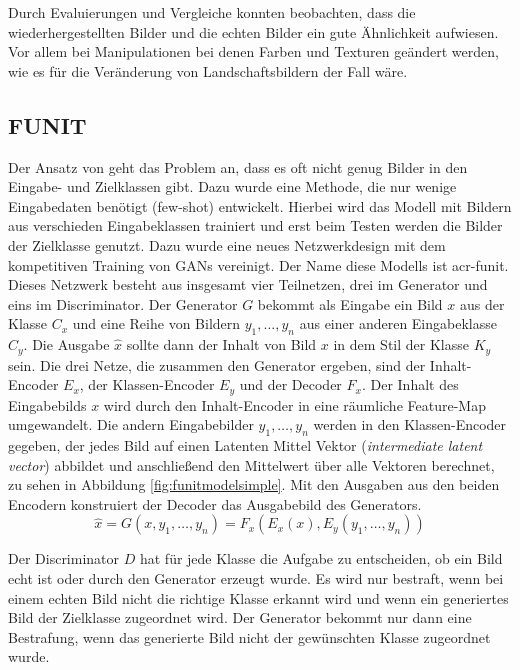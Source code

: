  
 Durch Evaluierungen und Vergleiche konnten \citeauthor{zhu2017unpaired} beobachten, dass die wiederhergestellten Bilder und die echten Bilder ein gute Ähnlichkeit aufwiesen. Vor allem bei Manipulationen bei denen Farben und Texturen geändert werden, wie es für die Veränderung von Landschaftsbildern der Fall wäre. 
 
 \subsection{FUNIT}%
 \label{sub:funit}
 Der Ansatz von \citeauthor{liu2019few} \cite{liu2019few}  geht das Problem an, dass es oft nicht genug Bilder in den Eingabe- und Zielklassen gibt. Dazu wurde eine Methode, die nur wenige Eingabedaten benötigt (few-shot) entwickelt. Hierbei wird das Modell mit Bildern aus verschieden Eingabeklassen trainiert und erst beim Testen werden die Bilder der Zielklasse genutzt.
 Dazu wurde eine neues Netzwerkdesign mit dem kompetitiven Training von GANs vereinigt. Der Name diese Modells ist  \acrfull{acr-funit}. Dieses Netzwerk besteht aus insgesamt vier Teilnetzen, drei im Generator und eins im Discriminator. Der Generator $G$ bekommt als Eingabe ein Bild $x$ aus der Klasse $C_x$ und eine Reihe von Bildern $y_1,\dots,y_n$ aus einer anderen Eingabeklasse $C_y$. Die Ausgabe $\hat{x}$ sollte dann der Inhalt von Bild $x$ in dem Stil der Klasse $K_y$ sein. 
 Die drei Netze, die zusammen den Generator ergeben, sind der Inhalt-Encoder $E_x$, der Klassen-Encoder $E_y$ und der Decoder $F_x$.
 Der Inhalt des Eingabebilds $x$ wird durch den Inhalt-Encoder in eine räumliche Feature-Map umgewandelt. Die andern Eingabebilder $y_1,\dots,y_n$ werden in den Klassen-Encoder gegeben, der jedes Bild auf einen Latenten Mittel Vektor (\emph{intermediate latent vector}) abbildet und anschließend den Mittelwert über alle Vektoren berechnet, zu sehen in Abbildung \ref{fig:funitmodelsimple}. 
 Mit den Ausgaben aus den beiden Encodern konstruiert der Decoder das Ausgabebild des Generators. 
 \[\hat{x} = G(x, y_1,\dots,y_n)= F_x(E_x(x), E_y(y_1,\dots,y_n))\]
 
 Der Discriminator $D$ hat für jede Klasse die Aufgabe zu entscheiden, ob ein Bild echt ist oder durch den Generator erzeugt wurde. Es wird nur bestraft, wenn bei einem echten Bild nicht die richtige Klasse erkannt wird und wenn ein generiertes Bild der Zielklasse zugeordnet wird. Der Generator bekommt nur dann eine Bestrafung, wenn das generierte Bild nicht der gewünschten Klasse zugeordnet wurde.
 
